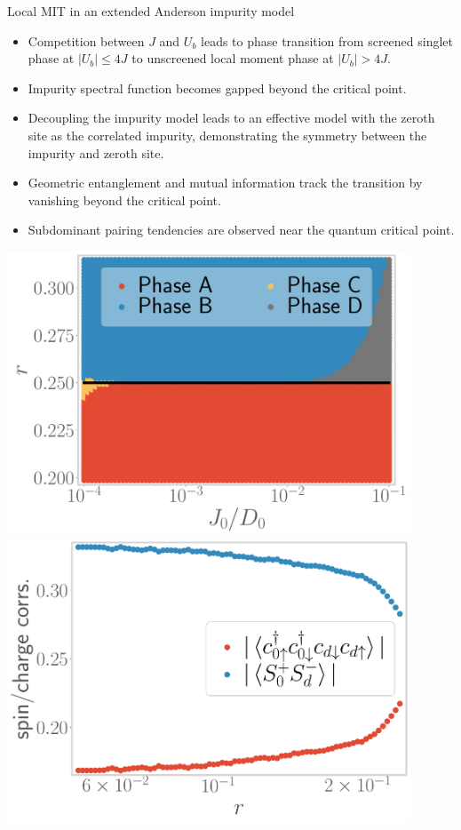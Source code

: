 \documentclass[11pt,aspectratio=169]{beamer}
\begin{document}
\begin{frame}{Local MIT in an extended Anderson impurity model}
\hspace*{-40pt}
\begin{minipage}{0.65\textwidth}
\begin{itemize}
\item Competition between $J$ and $U_b$ leads to phase transition from screened singlet phase at \(|U_b| \leq 4J\) to unscreened local moment phase at \(|U_b| > 4J\).
\item Impurity spectral function becomes gapped beyond the critical point.
\item Decoupling the impurity model leads to an effective model with the zeroth site as the correlated impurity, demonstrating the symmetry between the impurity and zeroth site.
\item Geometric entanglement and mutual information track the transition by vanishing beyond the critical point.
\item Subdominant pairing tendencies are observed near the quantum critical point.
\end{itemize}
\end{minipage}
\hspace*{5pt}
\begin{minipage}{0.41\textwidth}
\includegraphics[width=0.9\textwidth]{phase-map-MIT.pdf}
\includegraphics[width=0.9\textwidth]{odlro_d0.pdf}
\end{minipage}
\hspace*{-40pt}
\end{frame}
\end{document}
